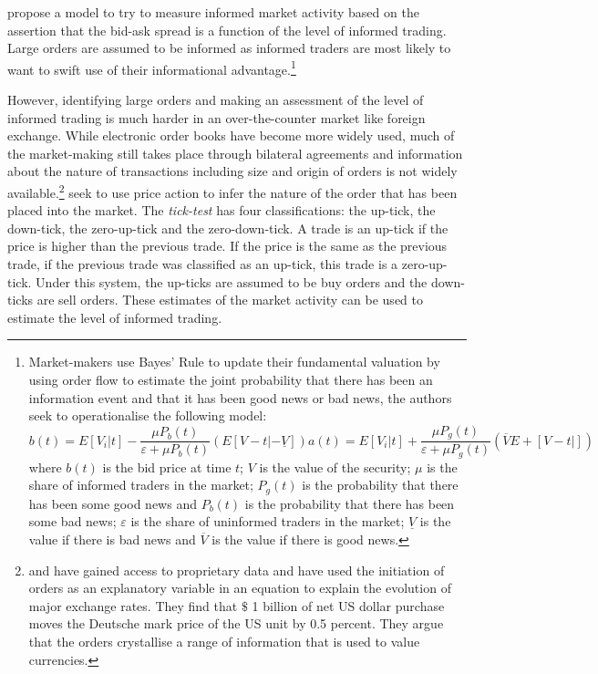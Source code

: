 \documentclass[preprint,12pt,authoryear]{elsarticle}
\begin{document}
\citet{EasleyPIN2} propose a model to try to measure informed market activity based on the assertion that the bid-ask spread is a function of the level of informed trading.  Large orders are assumed to be informed as informed traders are most likely to want to swift use of their informational advantage.\footnote{Market-makers use Bayes' Rule to update their fundamental valuation by using order flow to estimate the joint probability that there has been an information event and that it has been good news or bad news, the authors seek to operationalise the following model:
\begin{subequations}
\begin{equation}
b(t) = E[V_i|t] - \frac{\mu P_b(t)}{\varepsilon + \mu P_b(t)}(E[V-t|-\underline{V}])
\end{equation}
\begin{equation}
a(t) = E[V_i|t] + \frac{\mu P_g(t)}{\varepsilon + \mu P_g(t)}(\overline{V}E+ [V-t|])
\end{equation}
\end{subequations}
  where $b(t)$ is the bid price at time $t$; $V$ is the value of the security; $\mu$ is the share of informed traders in the market; $P_g(t)$ is the probability that there has been some good news and $P_b(t)$ is the probability that there has been some bad news; $\varepsilon$ is the share of uninformed traders in the market; $\underline{V}$ is the value if there is bad news and $\overline{V}$ is the value if there is good news.} 
  
However, identifying large orders and making an assessment of the level of informed trading is much harder in an over-the-counter market like foreign exchange. While electronic order books have become more widely used, much of the market-making still takes place through bilateral agreements and information about the nature of transactions including size and origin of orders is not widely available.\footnote{\citet{Lyons1995Microstructure} and \citet{Evans2002Order} have gained access to proprietary data and have used the initiation of orders as an explanatory variable in an equation to explain the evolution of major exchange rates.  They find that $\$$ 1 billion of net US dollar purchase moves the Deutsche mark price of the US unit by 0.5 percent. They argue that the orders crystallise a range of information that is used to value currencies.}  \citet{LeeandReady} seek to use price action to infer the nature of the order that has been placed into the market.  The \emph{tick-test} has four classifications: the up-tick, the down-tick, the zero-up-tick and the zero-down-tick. A trade is an up-tick if the price is higher than the previous trade.  If the price is the same as the previous trade, if the previous trade was classified as an up-tick, this trade is a zero-up-tick. Under this system, the up-ticks are assumed to be buy orders and the down-ticks are sell orders. These estimates of the market activity can be used to estimate the level of informed trading.
\end{document}
